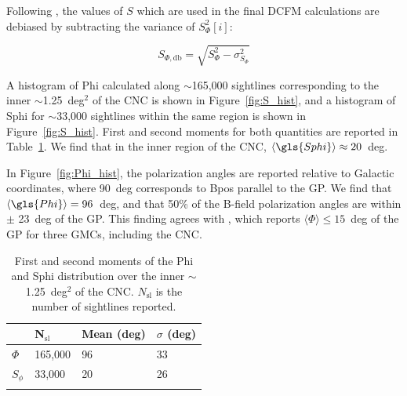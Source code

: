 Following \citet{fissel2016balloon}, the values of $S$ which are used in the final DCFM calculations are debiased by subtracting the variance of $S^{2}_{\Phi}[i]$:

\begin{equation}\label{eq:ADF}
  S_{\Phi,\mathrm{db}} = \sqrt{S_{\Phi}^{2} - \sigma^{2}_{S_\Phi}}
\end{equation}

A histogram of \gls{Phi} calculated along $\sim$165,000 sightlines corresponding to the inner $\sim$1.25~deg$^{2}$ of the CNC is shown in Figure~\ref{fig:S_hist}, and a histogram of \gls{Sphi} for $\sim$33,000 sightlines within the same region is shown in Figure~\ref{fig:S_hist}. First and second moments for both quantities are reported in Table~\ref{table:S_and_Phi}. We find that in the inner region of the CNC, $\langle \gls{Sphi} \rangle \approx 20$~deg.

In Figure~\ref{fig:Phi_hist}, the polarization angles are reported relative to Galactic coordinates, where 90~deg corresponds to \gls{Bpos} parallel to the GP\@. We find that $\langle \gls{Phi} \rangle = 96$~deg, and that 50\% of the B-field polarization angles are within $\pm$ 23~deg of the GP\@. This finding agrees with \citet{li2006results}, which reports $\langle \Phi \rangle \leq 15$~deg of the GP for three GMCs, including the CNC\@.

\begin{table}[!htbp]
\centering
\begin{tabular}{@{}llll@{}}
\dtoprule{}
 & N$_{\mathrm{sl}}$ & Mean (deg) & $\sigma$ (deg) \\ \midrule
$\Phi$  & 165,000 & 96 & 33 \\
$S_{\phi}$  & 33,000 & 20 & 26 \\ \dbottomrule{}
\\
\end{tabular}
\caption[~First and second moments of the  and  distribution over the inner  of the CNC.]{First and second moments of the \gls{Phi} and \gls{Sphi} distribution over the inner $\sim$1.25~deg$^{2}$ of the CNC\@. $N_{\mathrm{sl}}$ is the number of sightlines reported.}
\label{table:S_and_Phi}
\end{table}

